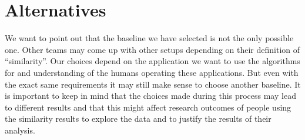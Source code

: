 \section{Alternatives}
\label{sec:baseline:alt}

We want to point out that the baseline we have selected is not the only possible one. Other teams may come up with other setups depending on their definition of \enquote{similarity}. Our choices depend on the application we want to use the algorithms for and understanding of the humans operating these applications. But even with the exact same requirements it may still make sense to choose another baseline. It is important to keep in mind that the choices made during this process may lead to different results and that this might affect research outcomes of people using the similarity results to explore the data and to justify the results of their analysis.
